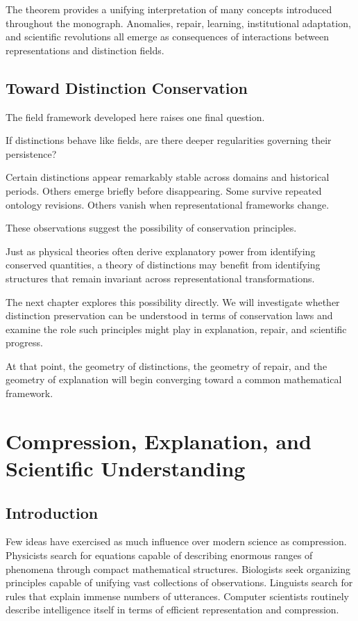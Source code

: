 \documentclass[11pt,oneside,openany]{book}
\begin{document}
The theorem provides a unifying interpretation of many concepts introduced throughout the monograph. Anomalies, repair, learning, institutional adaptation, and scientific revolutions all emerge as consequences of interactions between representations and distinction fields.

\section{Toward Distinction Conservation}

The field framework developed here raises one final question.

If distinctions behave like fields, are there deeper regularities governing their persistence?

Certain distinctions appear remarkably stable across domains and historical periods. Others emerge briefly before disappearing. Some survive repeated ontology revisions. Others vanish when representational frameworks change.

These observations suggest the possibility of conservation principles.

Just as physical theories often derive explanatory power from identifying conserved quantities, a theory of distinctions may benefit from identifying structures that remain invariant across representational transformations.

The next chapter explores this possibility directly. We will investigate whether distinction preservation can be understood in terms of conservation laws and examine the role such principles might play in explanation, repair, and scientific progress.

At that point, the geometry of distinctions, the geometry of repair, and the geometry of explanation will begin converging toward a common mathematical framework.

\chapter{Compression, Explanation, and Scientific Understanding}

\section{Introduction}

Few ideas have exercised as much influence over modern science as compression. Physicists search for equations capable of describing enormous ranges of phenomena through compact mathematical structures. Biologists seek organizing principles capable of unifying vast collections of observations. Linguists search for rules that explain immense numbers of utterances. Computer scientists routinely describe intelligence itself in terms of efficient representation and compression.
\end{document}
